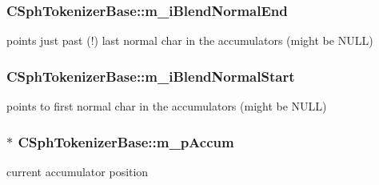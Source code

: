 \hypertarget{classCSphTokenizerBase_a2fb10f257a37a51c31ee8fcb01155467}{
\subsubsection[{m\-\_\-i\-Blend\-Normal\-End}]{ C\-Sph\-Tokenizer\-Base\-::m\-\_\-i\-Blend\-Normal\-End\hspace{0.3cm}{\ttfamily [protected]}}}\label{classCSphTokenizerBase_a2fb10f257a37a51c31ee8fcb01155467}


points just past (!) last normal char in the accumulators (might be N\-U\-L\-L) 

\hypertarget{classCSphTokenizerBase_ab799f3465135203b6b96f5546dd3f300}{
\subsubsection[{m\-\_\-i\-Blend\-Normal\-Start}]{ C\-Sph\-Tokenizer\-Base\-::m\-\_\-i\-Blend\-Normal\-Start\hspace{0.3cm}{\ttfamily [protected]}}}\label{classCSphTokenizerBase_ab799f3465135203b6b96f5546dd3f300}


points to first normal char in the accumulators (might be N\-U\-L\-L) 

\hypertarget{classCSphTokenizerBase_a39a6d21608e3114e25638e1a4b8c4ec2}{
\subsubsection[{m\-\_\-p\-Accum}]{$\ast$ C\-Sph\-Tokenizer\-Base\-::m\-\_\-p\-Accum\hspace{0.3cm}{\ttfamily [protected]}}}\label{classCSphTokenizerBase_a39a6d21608e3114e25638e1a4b8c4ec2}


current accumulator position 

